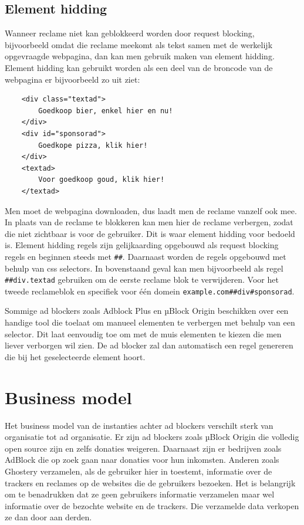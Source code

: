 \documentclass[pdftex,a4paper,12pt,twoside]{report}
\begin{document}
\subsection{ Element hidding}
\label{sec:Element hidding}
Wanneer reclame niet kan geblokkeerd worden door request blocking, bijvoorbeeld omdat die reclame meekomt als tekst samen met de werkelijk opgevraagde webpagina, dan kan men gebruik maken van element hidding. Element hidding kan gebruikt worden als een deel van de broncode van de webpagina er bijvoorbeeld zo uit ziet:
\lstset{language=Html,tabsize=2}  
\begin{lstlisting}
	<div class="textad">
		Goedkoop bier, enkel hier en nu!
	</div>
	<div id="sponsorad">
		Goedkope pizza, klik hier!
	</div>
	<textad>
		Voor goedkoop goud, klik hier!
	</textad>
\end{lstlisting}

Men moet de webpagina downloaden, dus laadt men de reclame vanzelf ook mee. In plaats van de reclame te blokkeren kan men hier de reclame verbergen, zodat die niet zichtbaar is voor de gebruiker. Dit is waar element hidding voor bedoeld is. Element hidding regels zijn gelijkaarding opgebouwd als request blocking regels en beginnen steeds met \texttt{\#\#}. Daarnaast worden de regels opgebouwd met behulp van css selectors. In bovenstaand geval kan men bijvoorbeeld als regel \texttt{\#\#div.textad} gebruiken om de eerste reclame blok te verwijderen. Voor het tweede reclameblok en specifiek voor één domein \texttt{example.com\#\#div\#sponsorad}.

Sommige ad blockers zoals Adblock Plus en µBlock Origin beschikken over een handige tool die toelaat om manueel elementen te verbergen met behulp van een selector. Dit laat eenvoudig toe om met de muis elementen te kiezen die men liever verborgen wil zien. De ad blocker zal dan automatisch een regel genereren die bij het geselecteerde element hoort.

\section{Business model}
\label{sec:Business model}
Het business model van de instanties achter ad blockers verschilt sterk van organisatie tot ad organisatie. Er zijn ad blockers zoals µBlock Origin die volledig open source zijn en zelfs donaties weigeren. Daarnaast zijn er bedrijven zoals AdBlock die op zoek gaan naar donaties voor hun inkomsten. Anderen zoals Ghostery verzamelen, als de gebruiker hier in toestemt, informatie over de trackers en reclames op de websites die de gebruikers bezoeken. Het is belangrijk om te benadrukken dat ze geen gebruikers informatie verzamelen maar wel informatie over de bezochte website en de trackers. Die verzamelde data verkopen ze dan door aan derden.
\end{document}
